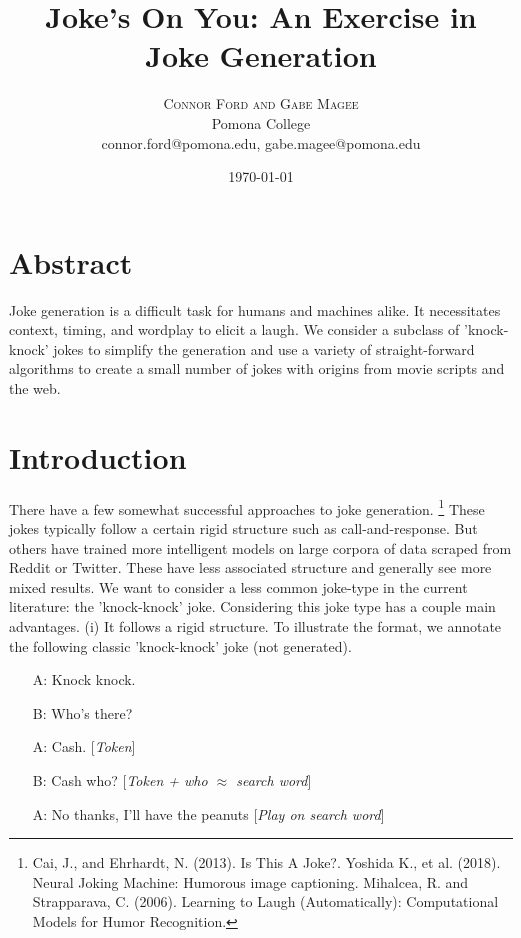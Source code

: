 \documentclass[twoside,twocolumn]{article}
\title{Joke's On You: An Exercise in Joke Generation}
\author{%
\textsc{Connor Ford and Gabe Magee} \\[1ex] 
\normalsize Pomona College \\ 
\normalsize connor.ford@pomona.edu, gabe.magee@pomona.edu
}
\date{\today}
\begin{document}
\maketitle

\section*{Abstract}

Joke generation is a difficult task for humans and machines alike. It necessitates context, timing, and wordplay to elicit a laugh. We consider a subclass of 'knock-knock' jokes to simplify the generation and use a variety of straight-forward algorithms to create a small number of jokes with origins from movie scripts and the web.

\section{Introduction}

There have a few somewhat successful approaches to joke generation. \footnote{Cai, J., and Ehrhardt, N. (2013). Is This A Joke?. Yoshida K., et al. (2018). Neural Joking Machine: Humorous image captioning. Mihalcea, R. and Strapparava, C. (2006). Learning to Laugh (Automatically): Computational Models for Humor Recognition.} 
These jokes typically follow a certain rigid structure such as call-and-response. But others have trained more intelligent models on large corpora of data scraped from Reddit or Twitter. These have less associated structure and generally see more mixed results.
We want to consider a less common joke-type in the current literature: the 'knock-knock' joke. Considering this joke type has a couple main advantages.
(i) It follows a rigid structure. To illustrate the format, we annotate the following classic 'knock-knock' joke (not generated).
\begin{center}
\begin{enumerate}
\item[A:] Knock knock.
\item[B:] Who's there?
\item[A:] Cash. [\emph{Token}]
\item[B:] Cash who? [\emph{Token + who $\approx$ search word}]
\item[A:] No thanks, I'll have the peanuts [\emph{Play on search word}]
\end{enumerate}
\end{center}
\end{document}
